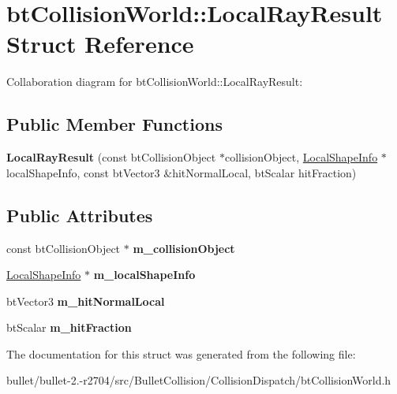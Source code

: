 \hypertarget{structbt_collision_world_1_1_local_ray_result}{\section{bt\+Collision\+World\+:\+:Local\+Ray\+Result Struct Reference}
\label{structbt_collision_world_1_1_local_ray_result}
}


Collaboration diagram for bt\+Collision\+World\+:\+:Local\+Ray\+Result\+:
\subsection*{Public Member Functions}
\begin{DoxyCompactItemize}
\item 
\hypertarget{structbt_collision_world_1_1_local_ray_result_aaa67cba647d03ce66c5feb8d3ba74c12}{{\bfseries Local\+Ray\+Result} (const bt\+Collision\+Object $\ast$collision\+Object, \hyperlink{structbt_collision_world_1_1_local_shape_info}{Local\+Shape\+Info} $\ast$local\+Shape\+Info, const bt\+Vector3 \&hit\+Normal\+Local, bt\+Scalar hit\+Fraction)}\label{structbt_collision_world_1_1_local_ray_result_aaa67cba647d03ce66c5feb8d3ba74c12}

\end{DoxyCompactItemize}
\subsection*{Public Attributes}
\begin{DoxyCompactItemize}
\item 
\hypertarget{structbt_collision_world_1_1_local_ray_result_a70032046e011cdbf3cbbbfcb0332118a}{const bt\+Collision\+Object $\ast$ {\bfseries m\+\_\+collision\+Object}}\label{structbt_collision_world_1_1_local_ray_result_a70032046e011cdbf3cbbbfcb0332118a}

\item 
\hypertarget{structbt_collision_world_1_1_local_ray_result_a46022b46ef5a18e44ed141ea1b1abeca}{\hyperlink{structbt_collision_world_1_1_local_shape_info}{Local\+Shape\+Info} $\ast$ {\bfseries m\+\_\+local\+Shape\+Info}}\label{structbt_collision_world_1_1_local_ray_result_a46022b46ef5a18e44ed141ea1b1abeca}

\item 
\hypertarget{structbt_collision_world_1_1_local_ray_result_ad82b15c5fafbbef1d60c9c0c66774288}{bt\+Vector3 {\bfseries m\+\_\+hit\+Normal\+Local}}\label{structbt_collision_world_1_1_local_ray_result_ad82b15c5fafbbef1d60c9c0c66774288}

\item 
\hypertarget{structbt_collision_world_1_1_local_ray_result_a7404aa8c0c9c12bb50898ddc2f86a6a1}{bt\+Scalar {\bfseries m\+\_\+hit\+Fraction}}\label{structbt_collision_world_1_1_local_ray_result_a7404aa8c0c9c12bb50898ddc2f86a6a1}

\end{DoxyCompactItemize}


The documentation for this struct was generated from the following file\+:\begin{DoxyCompactItemize}
\item 
bullet/bullet-\/2.-\/r2704/src/\+Bullet\+Collision/\+Collision\+Dispatch/bt\+Collision\+World.\+h\end{DoxyCompactItemize}
